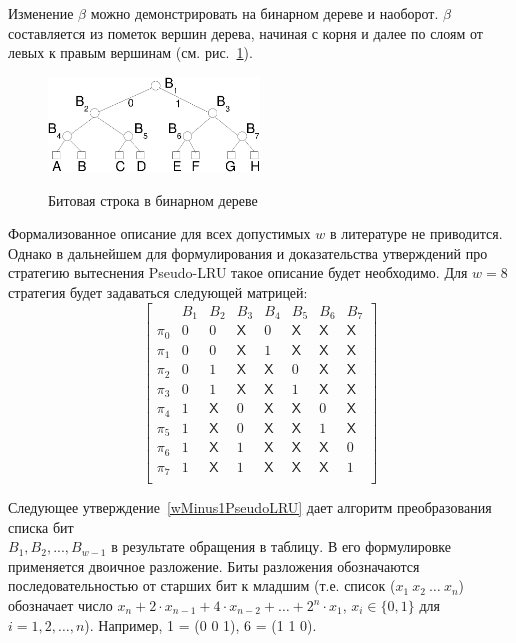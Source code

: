 \documentclass[14pt]{extreport}
\newcommand{\PseudoLRU}{\textsf{Pseudo-LRU}\xspace}
\begin{document}
Изменение $\beta$ можно демонстрировать на бинарном дереве и
наоборот. $\beta$ составляется из пометок вершин дерева,
начиная с корня и далее по слоям от левых к правым вершинам (см.
рис.~\ref{plru_bittree}).

\begin{figure}[h] \center
  \includegraphics[width=0.5\textwidth]{1.review/plru}\\
  \caption{Битовая строка в бинарном дереве}\label{plru_bittree}
\end{figure}

Формализованное описание для всех допустимых $w$ в литературе не
приводится. Однако в дальнейшем для формулирования и доказательства
утверждений про стратегию вытеснения \PseudoLRU такое описание будет
необходимо. Для $w=8$ стратегия будет задаваться следующей матрицей:
$$
\left[
  \begin{array}{c|ccccccc}
          & B_1 & B_2 & B_3 & B_4 & B_5 & B_6 & B_7 \\ \hline
    \pi_0 & 0 & 0 & \textsf{X} & 0 & \textsf{X} & \textsf{X} & \textsf{X} \\
    \pi_1 & 0 & 0 & \textsf{X} & 1 & \textsf{X} & \textsf{X} & \textsf{X} \\
    \pi_2 & 0 & 1 & \textsf{X} & \textsf{X} & 0 & \textsf{X} & \textsf{X} \\
    \pi_3 & 0 & 1 & \textsf{X} & \textsf{X} & 1 & \textsf{X} & \textsf{X} \\
    \pi_4 & 1 & \textsf{X} & 0 & \textsf{X} & \textsf{X} & 0 & \textsf{X} \\
    \pi_5 & 1 & \textsf{X} & 0 & \textsf{X} & \textsf{X} & 1 & \textsf{X} \\
    \pi_6 & 1 & \textsf{X} & 1 & \textsf{X} & \textsf{X} & \textsf{X} & 0 \\
    \pi_7 & 1 & \textsf{X} & 1 & \textsf{X} & \textsf{X} & \textsf{X} & 1 \\
  \end{array}
\right]
$$

Следующее утверждение~\ref{wMinus1PseudoLRU} дает алгоритм
преобразования списка бит\\ $B_1, B_2, ..., B_{w{-}1}$ в результате
обращения в таблицу. В его формулировке применяется двоичное
разложение. Биты разложения обозначаются последовательностью от
старших бит к младшим (т.е. список ($x_1~x_2~\dots~x_n$) обозначает
число $x_n + 2\cdot x_{n-1} + 4\cdot x_{n-2} + \dots + 2^n\cdot x_1$, $x_i \in \{0,
1\}$ для $i = 1, 2, \dots, n$). Например, 1 = (0 0 1), 6 = (1 1 0).
\end{document}
